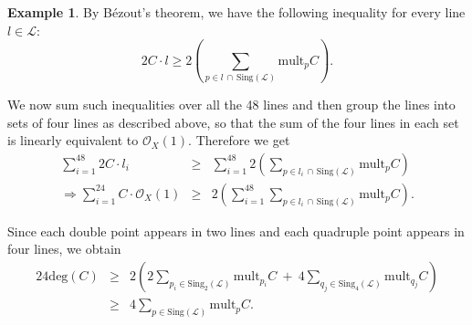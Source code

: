 \documentclass[12pt,reqno]{amsart}
\theoremstyle{plain}
\numberwithin{equation}{section}
\theoremstyle{definition}
\newtheorem{example}[theorem]{Example}
\begin{document}
\begin{example}
  By B\'ezout's theorem, we have the following inequality for every line $l \in \mathcal{L}$:
		$$2 C \cdot l \ge 2\left( \sum_{p \in l \,\cap \,\text{Sing} (\mathcal{L})} \text{mult}_p C \right).$$
  
We now sum such inequalities over all the 48 lines and then group the lines into sets of four lines as described above, so that the sum of the four lines in each set is linearly equivalent to $\mathcal{O}_X(1)$.  Therefore we get
               \begin{eqnarray*}
                \sum\limits_{i=1}^{48} 2 C \cdot l_i &\ge& \sum\limits_{i=1}^{48} 2\left( \sum_{p \in l_i \,\cap \,\text{Sing} (\mathcal{L})} \text{mult}_p C \right) \\
                \Rightarrow  \sum\limits_{i=1}^{24} C \cdot \mathcal{O}_X(1) &\ge&  2\left( \sum\limits_{i=1}^{48}\sum_{p \in l_i \,\cap \,\text{Sing} (\mathcal{L})} \text{mult}_p C \right).
               \end{eqnarray*}

Since each double point appears in two lines and each quadruple point appears in four lines, we obtain 
		\begin{eqnarray*}
				24 \text{deg}(C) &\geq& 2 \left(2\sum\limits_{p_i \in \text{Sing}_2(\mathcal{L})} \text{mult}_{p_i} C ~+~ 4\sum\limits_{q_j \in \text{Sing}_4(\mathcal{L})} \text{mult}_{q_j}C \right) \\
		 &\geq& 4 \sum\limits_{p \in\text{Sing}(\mathcal{L})} \text{mult}_{p}C.
		\end{eqnarray*}
		\iffalse
		Using the sets  $\mathcal{L}_1$, $\mathcal{L}_2$, \ldots, $\mathcal{L}_{24}$  constructed above, we obtain
		\begin{eqnarray*}
	\sum\limits_{i=1}^{48} C \cdot l_i &\geq& 2\sum\limits_{p\in \text{Sing}(\mathcal{L})} \text{mult}_pC \\ 
		\Longrightarrow \sum\limits_{1}^{24} \mathcal{O}_X(1) \cdot C  &\geq& 2\sum\limits_{p\in \text{Sing}(\mathcal{L})} \text{mult}_pC \\ 
		\Longrightarrow 24 \text{deg}(C) &\geq& 2 \left(2\sum\limits_{p_i \in \text{Sing}_2(\mathcal{L})} \text{mult}_{p_i} C ~+~ 4\sum\limits_{p_j \in \text{Sing}_4(\mathcal{L})} \text{mult}_{p_j}C \right) \\
		\Longrightarrow 24 \text{deg}(C) &\geq& 4 \sum\limits_{p \in C\cap \text{Sing}(\mathcal{L})} \text{mult}_{p}C \\
		\Longrightarrow 6 \text{deg}(C) &\geq&  \sum\limits_{p \in C\cap \text{Sing}(\mathcal{L})} \text{mult}_{p}C.
		\end{eqnarray*}
		\fi


\end{example}
\end{document}
